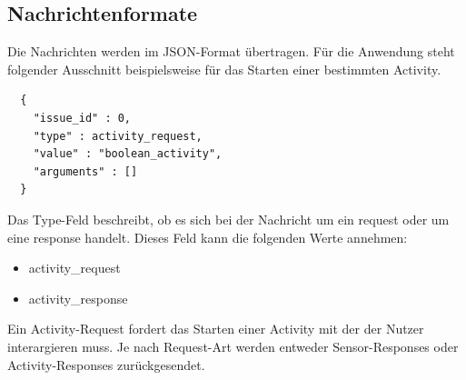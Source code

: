 \documentclass[11pt,a4paper]{report}
\begin{document}

\subsection*{Nachrichtenformate}
Die Nachrichten werden im JSON-Format übertragen.
Für die Anwendung steht folgender Ausschnitt beispielsweise für das Starten einer bestimmten Activity.
\begin{lstlisting}
  {
    "issue_id" : 0,
    "type" : activity_request,
    "value" : "boolean_activity",
    "arguments" : []
  }
\end{lstlisting}
Das Type-Feld beschreibt, ob es sich bei der Nachricht um ein request oder um eine response handelt.
Dieses Feld kann die folgenden Werte annehmen:
\begin{itemize}
  \item activity\_request
  \item activity\_response
\end{itemize}
Ein Activity-Request fordert das Starten einer Activity mit der der Nutzer interargieren muss.
Je nach Request-Art werden entweder Sensor-Responses oder Activity-Responses zurückgesendet.
\end{document}

